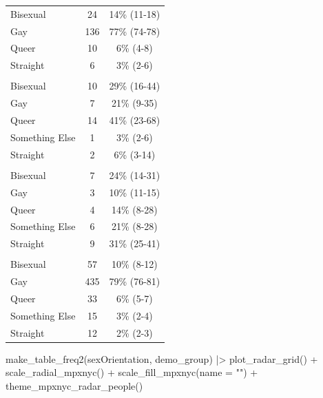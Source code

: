 \documentclass[
  letterpaper,
  DIV=11,
  numbers=noendperiod,
  oneside]{scrreprt}
\newenvironment{Shaded}{\begin{snugshade}}{\end{snugshade}}
\newcommand{\AttributeTok}[1]{\textcolor[rgb]{0.40,0.45,0.13}{#1}}
\newcommand{\FunctionTok}[1]{\textcolor[rgb]{0.28,0.35,0.67}{#1}}
\newcommand{\NormalTok}[1]{\textcolor[rgb]{0.00,0.23,0.31}{#1}}
\newcommand{\SpecialCharTok}[1]{\textcolor[rgb]{0.37,0.37,0.37}{#1}}
\newcommand{\StringTok}[1]{\textcolor[rgb]{0.13,0.47,0.30}{#1}}
\begin{document}
\begin{longtable*}{lcc}
\midrule\addlinespace[2.5pt]
 \\ 
\midrule\addlinespace[2.5pt]
Bisexual & 24 & 14\% (11-18) \\ 
Gay & 136 & 77\% (74-78) \\ 
Queer & 10 & 6\% (4-8) \\ 
Straight & 6 & 3\% (2-6) \\ 
\midrule\addlinespace[2.5pt]
 \\ 
\midrule\addlinespace[2.5pt]
Bisexual & 10 & 29\% (16-44) \\ 
Gay & 7 & 21\% (9-35) \\ 
Queer & 14 & 41\% (23-68) \\ 
Something Else & 1 & 3\% (2-6) \\ 
Straight & 2 & 6\% (3-14) \\ 
\midrule\addlinespace[2.5pt]
 \\ 
\midrule\addlinespace[2.5pt]
Bisexual & 7 & 24\% (14-31) \\ 
Gay & 3 & 10\% (11-15) \\ 
Queer & 4 & 14\% (8-28) \\ 
Something Else & 6 & 21\% (8-28) \\ 
Straight & 9 & 31\% (25-41) \\ 
\midrule\addlinespace[2.5pt]
 \\ 
\midrule\addlinespace[2.5pt]
Bisexual & 57 & 10\% (8-12) \\ 
Gay & 435 & 79\% (76-81) \\ 
Queer & 33 & 6\% (5-7) \\ 
Something Else & 15 & 3\% (2-4) \\ 
Straight & 12 & 2\% (2-3) \\ 
\bottomrule
\end{longtable*}

\begin{Shaded}
\begin{Highlighting}[]
\FunctionTok{make\_table\_freq2}\NormalTok{(sexOrientation, demo\_group) }\SpecialCharTok{|\textgreater{}}
  \FunctionTok{plot\_radar\_grid}\NormalTok{()   }\SpecialCharTok{+}
  \FunctionTok{scale\_radial\_mpxnyc}\NormalTok{() }\SpecialCharTok{+}
  \FunctionTok{scale\_fill\_mpxnyc}\NormalTok{(}\AttributeTok{name =} \StringTok{""}\NormalTok{) }\SpecialCharTok{+}
  \FunctionTok{theme\_mpxnyc\_radar\_people}\NormalTok{() }
\end{Highlighting}
\end{Shaded}
\end{document}
